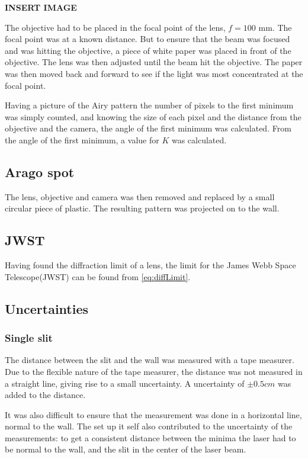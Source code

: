 \documentclass{emulateapj}
\begin{document}
\textbf{INSERT IMAGE}

The objective had to be placed in the focal point of the lens, $f = 100$ mm. The focal point was at a known distance. But to ensure that the beam was focused and was hitting the objective, a piece of white paper was placed in front of the objective. The lens was then adjusted until the beam hit the objective. The paper was then moved back and forward to see if the light was most concentrated at the focal point. 

Having a picture of the Airy pattern the number of pixels to the first minimum was simply counted, and knowing the size of each pixel and the distance from the objective and the camera, the angle of the first minimum was calculated. From the angle of the first minimum, a value for $K$ was calculated.

\subsection{Arago spot}
The lens, objective and camera was then removed and replaced by a small circular piece of plastic. The resulting pattern was projected on to the wall.

\subsection{JWST} 
Having found the diffraction limit of a lens, the limit for the James Webb Space Telescope(JWST) can be found from \eqref{eq:diffLimit}. 

\subsection{Uncertainties}
\subsubsection{Single slit}
The distance between the slit and the wall was measured with a tape measurer. Due to the flexible nature of the tape measurer, the distance was not measured in a straight line, giving rise to a small uncertainty. A uncertainty of $\pm 0.5 cm$ was added to the distance.

It was also difficult to ensure that the measurement was done in a horizontal line, normal to the wall. The set up it self also contributed to the uncertainty of the measurements: to get a consistent distance between the minima the laser had to be normal to the wall, and the slit in the center of the laser beam. \\
\end{document}
